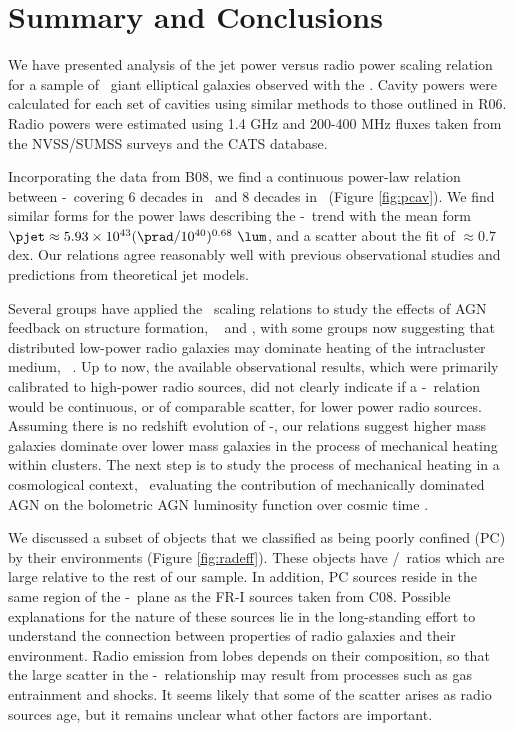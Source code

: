 \documentclass{emulateapj}
\begin{document}
\section{Summary and Conclusions}
\label{sec:summary}

We have presented analysis of the jet power versus radio power scaling
relation for a sample of \samp\ giant elliptical galaxies observed
with the \cxo. Cavity powers were calculated for each set of cavities
using similar methods to those outlined in R06. Radio powers were
estimated using 1.4 GHz and 200-400 MHz fluxes taken from the
NVSS/SUMSS surveys and the CATS database.

Incorporating the data from B08, we find a continuous power-law
relation between \pjet-\prad\ covering 6 decades in \prad\ and 8
decades in \pjet\ (Figure \ref{fig:pcav}). We find similar forms for
the power laws describing the \pjet-\prad\ trend with the mean form
$\pjet \approx 5.93\times10^{43} (\prad/10^{40})^{0.68} ~\lum$, and a
scatter about the fit of $\approx 0.7$ dex. Our relations agree
reasonably well with previous observational studies and predictions
from theoretical jet models.

Several groups have applied the \birzan\ scaling relations to study
the effects of AGN feedback on structure formation,
\eg\ \citet{best07} and \citet{2007MNRAS.379..260M}, with some groups
now suggesting that distributed low-power radio galaxies may dominate
heating of the intracluster medium,
\eg\ \citet{2009arXiv0908.3158H}. Up to now, the available
observational results, which were primarily calibrated to high-power
radio sources, did not clearly indicate if a \pjet-\prad\ relation
would be continuous, or of comparable scatter, for lower power radio
sources. Assuming there is no redshift evolution of \pjet-\prad, our
relations suggest higher mass galaxies dominate over lower mass
galaxies in the process of mechanical heating within clusters. The
next step is to study the process of mechanical heating in a
cosmological context, \eg\ evaluating the contribution of mechanically
dominated AGN on the bolometric AGN luminosity function over cosmic
time \citep{2009MNRAS.395..518C}.

We discussed a subset of objects that we classified as being poorly
confined (PC) by their environments (Figure \ref{fig:radeff}). These
objects have \pjet/\prad\ ratios which are large relative to the rest
of our sample. In addition, PC sources reside in the same region of
the \pjet-\prad\ plane as the FR-I sources taken from C08. Possible
explanations for the nature of these sources lie in the long-standing
effort to understand the connection between properties of radio
galaxies and their environment. Radio emission from lobes depends on
their composition, so that the large scatter in the
\pjet-\prad\ relationship may result from processes such as gas
entrainment and shocks. It seems likely that some of the scatter
arises as radio sources age, but it remains unclear what other factors
are important.
\end{document}
